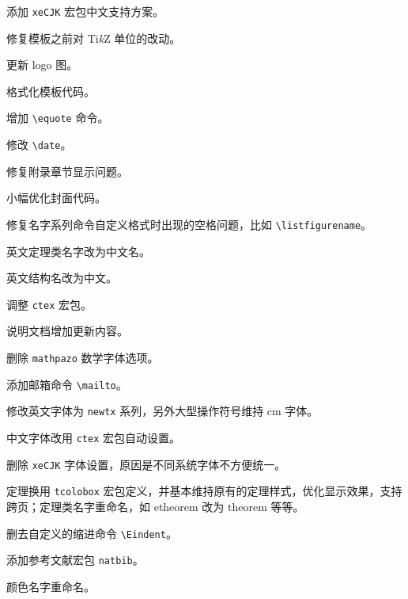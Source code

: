 \documentclass[lang=cn,10pt]{elegantbook}
\begin{document}

\begin{change}
  \item 添加 \lstinline{xeCJK} 宏包中文支持方案。
  \item 修复模板之前对 Ti\textit{k}Z 单位的改动。
  \item 更新 logo 图。
\end{change}


\begin{change}
  \item 格式化模板代码。
  \item 增加 \lstinline{\equote} 命令。
  \item 修改 \lstinline{\date}。
\end{change}


\begin{change}
  \item 修复附录章节显示问题。
  \item 小幅优化封面代码。
\end{change}


\begin{change}
  \item 修复名字系列命令自定义格式时出现的空格问题，比如 \lstinline{\listfigurename}。
  \item 英文定理类名字改为中文名。
  \item 英文结构名改为中文。
\end{change}


\begin{change}
  \item 调整 \lstinline{ctex} 宏包。
  \item 说明文档增加更新内容。
\end{change}


\begin{change}
  \item 删除 \lstinline{mathpazo} 数学字体选项。
  \item 添加邮箱命令 \lstinline{\mailto}。
  \item 修改英文字体为 \lstinline{newtx} 系列，另外大型操作符号维持 cm 字体。
  \item 中文字体改用 \lstinline{ctex} 宏包自动设置。
  \item 删除 \lstinline{xeCJK} 字体设置，原因是不同系统字体不方便统一。
  \item 定理换用 \lstinline{tcolobox} 宏包定义，并基本维持原有的定理样式，优化显示效果，支持跨页；定理类名字重命名，如 etheorem 改为 theorem 等等。
  \item 删去自定义的缩进命令 \lstinline{\Eindent}。
  \item 添加参考文献宏包 \lstinline{natbib}。
  \item 颜色名字重命名。
\end{change}
\end{document}
